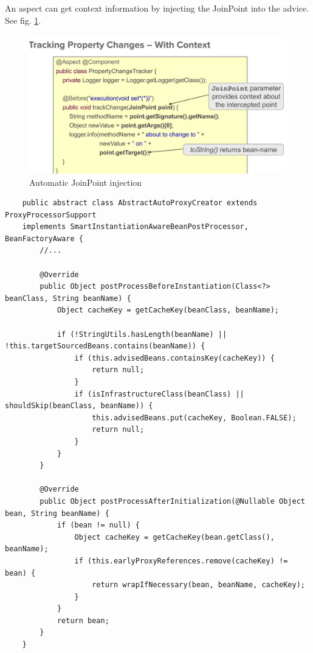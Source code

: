 \documentclass{scrartcl}
\begin{document}
An aspect can get context information by injecting the JoinPoint into the advice. See fig. \ref{fig:AOP-join-point}.

\begin{figure}
    \centering
    \includegraphics[width=1\linewidth]{AOP-join-point}
    \caption{Automatic JoinPoint injection}
    \label{fig:AOP-join-point}
\end{figure}

\begin{lstlisting}
    public abstract class AbstractAutoProxyCreator extends ProxyProcessorSupport
    implements SmartInstantiationAwareBeanPostProcessor, BeanFactoryAware {
        //...

        @Override
        public Object postProcessBeforeInstantiation(Class<?> beanClass, String beanName) {
            Object cacheKey = getCacheKey(beanClass, beanName);

            if (!StringUtils.hasLength(beanName) || !this.targetSourcedBeans.contains(beanName)) {
                if (this.advisedBeans.containsKey(cacheKey)) {
                    return null;
                }
                if (isInfrastructureClass(beanClass) || shouldSkip(beanClass, beanName)) {
                    this.advisedBeans.put(cacheKey, Boolean.FALSE);
                    return null;
                }
            }
        }

        @Override
        public Object postProcessAfterInitialization(@Nullable Object bean, String beanName) {
            if (bean != null) {
                Object cacheKey = getCacheKey(bean.getClass(), beanName);
                if (this.earlyProxyReferences.remove(cacheKey) != bean) {
                    return wrapIfNecessary(bean, beanName, cacheKey);
                }
            }
            return bean;
        }
    }
\end{lstlisting}
\end{document}
